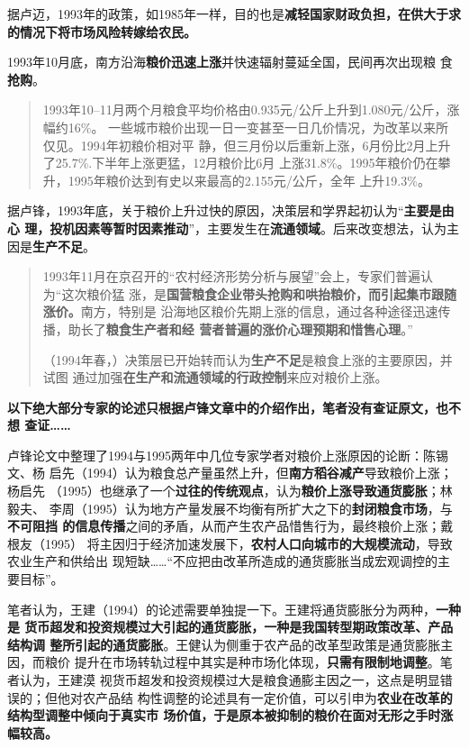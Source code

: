 据卢迈，1993年的政策，如1985年一样，目的也是\textbf{减轻国家财政负担，在供大于求
  的情况下将市场风险转嫁给农民。}\cite{lumaisg}

1993年10月底，南方沿海\textbf{粮价迅速上涨}并快速辐射蔓延全国，民间再次出现粮
食\textbf{抢购}。
\begin{quotation}
  1993年10--11月两个月粮食平均价格由0.935元/公斤上升到1.080元/公斤，涨幅约16\%。
  一些城市粮价出现一日一变甚至一日几价情况，为改革以来所仅见。1994年初粮价相对平
  静，但三月份以后重新上涨，6月份比2月上升了25.7\%.下半年上涨更猛，12月粮价比6月
  上涨31.8\%。1995年粮价仍在攀升，1995年粮价达到有史以来最高的2.155元/公斤，全年
  上升19.3\%。\cite{lufengsanci}
\end{quotation}

据卢锋，1993年底，关于粮价上升过快的原因，决策层和学界起初认为“\textbf{主要是由心
  理，投机因素等暂时因素推动}”，主要发生在\textbf{流通领域}。后来改变想法，认为主
因是\textbf{生产不足}。
\begin{quotation}
  1993年11月在京召开的“农村经济形势分析与展望”会上，专家们普遍认为“这次粮价猛
  涨，是\textbf{国营粮食企业带头抢购和哄抬粮价，而引起集市跟随涨价。}南方，特别是
  沿海地区粮价先期上涨的信息，通过各种途径迅速传播，助长了\textbf{粮食生产者和经
    营者普遍的涨价心理预期和惜售心理}。”

  （1994年春，）决策层已开始转而认为\textbf{生产不足}是粮食上涨的主要原因，并试图
  通过加强\textbf{在生产和流通领域的行政控制}来应对粮价上涨。
\end{quotation}

\textbf{以下绝大部分专家的论述只根据卢锋文章中的介绍作出，笔者没有查证原文，也不想
  查证……}

卢锋论文中整理了1994与1995两年中几位专家学者对粮价上涨原因的论断：陈锡文、杨
启先（1994）认为粮食总产量虽然上升，但\textbf{南方稻谷减产}导致粮价上涨；杨启先
（1995）也继承了一个\textbf{过往的传统观点}，认为\textbf{粮价上涨导致通货膨胀}；林毅夫、
李周（1995）认为地方产量发展不均衡有所扩大之下的\textbf{封闭粮食市场}，与\textbf{不可阻挡
  的信息传播}之间的矛盾，从而产生农产品惜售行为，最终粮价上涨；戴根友（1995）
将主因归于经济加速发展下，\textbf{农村人口向城市的大规模流动}，导致农业生产和供给出
现短缺……“不应把由改革所造成的通货膨胀当成宏观调控的主要目标”。

笔者认为，王建（1994）的论述需要单独提一下。王建将通货膨胀分为两种，\textbf{一种是
  货币超发和投资规模过大引起的通货膨胀，一种是我国转型期政策改革、产品结构调
  整所引起的通货膨胀}。王健认为侧重于农产品的改革型政策是通货膨胀主因，而粮价
提升在市场转轨过程中其实是种市场化体现，\textbf{只需有限制地调整}。笔者认为，王建漠
视货币超发和投资规模过大是粮食通膨主因之一，这点是明显错误的；但他对农产品结
构性调整的论述具有一定价值，可以引申为\textbf{农业在改革的结构型调整中倾向于真实市
  场价值，于是原本被抑制的粮价在面对无形之手时涨幅较高。}

